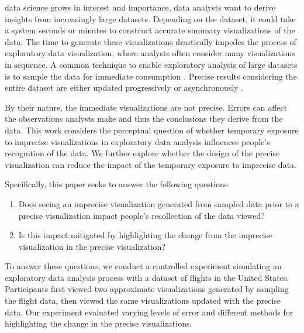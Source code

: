 \documentclass[10pt,journal,compsoc]{IEEEtran}
\begin{document}
% 
% 
% 
% 
 data science grows in interest and importance, data analysts want to derive insights from increasingly large datasets.
Depending on the dataset, it could take a system seconds or minutes to construct accurate summary visualizations of the data.
The time to generate these visualizations drastically impedes the process of exploratory data visualization, where analysts often consider many visualizations in sequence.
A common technique to enable exploratory analysis of large datasets is to sample the data for immediate consumption \cite{moritz2017pangloss}.
Precise results considering the entire dataset are either updated progressively \cite{fisher2012trust} or asynchronously \cite{moritz2017pangloss, kay2016ish}.

By their nature, the immediate visualizations are not precise.
Errors can affect the observations analysts make and thus the conclusions they derive from the data.
This work considers the perceptual question of whether temporary exposure to imprecise visualizations in exploratory data analysis influences people's recognition of the data.
We further explore whether the design of the precise visualization can reduce the impact of the temporary exposure to imprecise data.

Specifically, this paper seeks to answer the following questions:
\begin{enumerate}
\item Does seeing an imprecise visualization generated from sampled data prior to a precise visualization impact people's recollection of the data viewed?
\item Is this impact mitigated by highlighting the change from the imprecise visualization in the precise visualization?
\end{enumerate}

To answer these questions, we conduct a controlled experiment simulating an exploratory data analysis process with a dataset of flights in the United States.
Participants first viewed two approximate visualizations generated by sampling the flight data, then viewed the same visualizations updated with the precise data.
Our experiment evaluated varying levels of error and different methods for highlighting the change in the precise visualizations.
\end{document}
